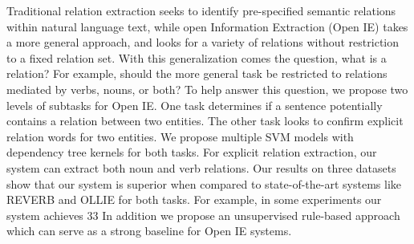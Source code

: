 Traditional relation extraction seeks to identify pre-specified semantic relations within natural language text, while open Information Extraction (Open
 IE) takes a more general approach, and looks for a variety of relations without
 restriction to a fixed relation set. With this generalization comes the
 question, what is a relation? For example, should the more general task be
 restricted to relations mediated by verbs, nouns, or both? To help answer this
 question, we propose two levels of subtasks for Open IE. One task determines if
 a sentence potentially contains a relation between two entities. The other task
 looks to confirm explicit relation words for two entities. We propose multiple
 SVM models with dependency tree kernels for both tasks. For explicit relation
 extraction, our system can extract both noun and verb relations. Our results on
 three datasets show that our system is superior when compared to
 state-of-the-art
 systems like REVERB and OLLIE for both tasks. For example, in some experiments
 our system achieves 33%
 In addition we propose an unsupervised rule-based approach which can serve as a
 strong baseline for Open IE systems.

